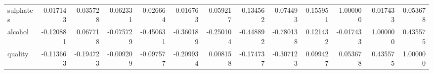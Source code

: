 \begin{tabular}{lrrrrrrrrrrrr}
sulphates            &      -0.017143 &         -0.035728 &     0.062331 &       -0.026664 &   0.016763 &             0.059217 &              0.134562 &  0.074493 &  0.155951 &   1.000000 & -0.017433 &  0.053678 \\
alcohol              &      -0.120881 &          0.067718 &    -0.075729 &       -0.450631 &  -0.360189 &            -0.250104 &             -0.448892 & -0.780138 &  0.121432 &  -0.017433 &  1.000000 &  0.435575 \\
quality              &      -0.113663 &         -0.194723 &    -0.009209 &       -0.097577 &  -0.209934 &             0.008158 &             -0.174737 & -0.307123 &  0.099427 &   0.053678 &  0.435575 &  1.000000 \\
\bottomrule
\end{tabular}
